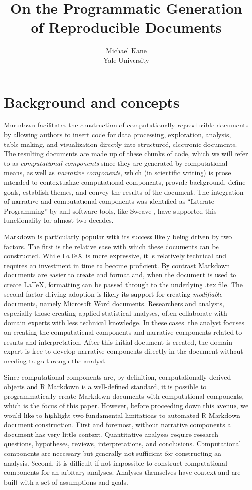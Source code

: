 \documentclass[
]{jss}
\author{
Michael Kane\\Yale University
}
\title{On the Programmatic Generation of Reproducible Documents}
\begin{document}
\hypertarget{background-and-concepts}{%
\section{Background and concepts}\label{background-and-concepts}}

 Markdown \citep{baumer2014} facilitates the construction of
computationally reproducible documents by allowing authors to insert
 code for data processing, exploration, analysis,
table-making, and visualization directly into structured, electronic
documents. The resulting documents are made up of these chunks of
 code, which we will refer to as \emph{computational
components} since they are generated by computational means, as well as
\emph{narrative components}, which (in scientific writing) is prose
intended to contextualize computational components, provide background,
define goals, establish themes, and convey the results of the document.
The integration of narrative and computational components was identified
as ``Literate Programming'' by \citet{knuth1984} and software tools,
like Sweave \citep{leisch2002}, have supported this functionality for
almost two decades.

 Markdown is particularly popular with its success likely
being driven by two factors. The first is the relative ease with which
these documents can be constructed. While \LaTeX ~is more expressive, it
is relatively technical and requires an investment in time to become
proficient. By contrast  Markdown documents are easier to
create and format and, when the document is used to create \LaTeX,
formatting can be passed through to the underlying .tex file. The second
factor driving adoption is likely its support for creating
\emph{modifiable} documents, namely Microsoft Word documents.
Researchers and analysts, especially those creating applied statistical
analyses, often collaborate with domain experts with less technical
knowledge. In these cases, the analyst focuses on creating the
computational components and narrative components related to results and
interpretation. After this initial document is created, the domain
expert is free to develop narrative components directly in the document
without needing to go through the analyst.

Since computational components are, by definition, computationally
derived objects and R Markdown is a well-defined standard, it is
possible to programmatically create  Markdown documents with
computational components, which is the focus of this paper. However,
before proceeding down this avenue, we would like to highlight two
fundamental limitations to automated R Markdown document construction.
First and foremost, without narrative components a document has very
little context. Quantitative analyses require research questions,
hypotheses, reviews, interpretations, and conclusions. Computational
components are necessary but generally not sufficient for constructing
an analysis. Second, it is difficult if not impossible to construct
computational components for an arbitary analyses. Analyses themselves
have context and are built with a set of assumptions and goals.
\end{document}
